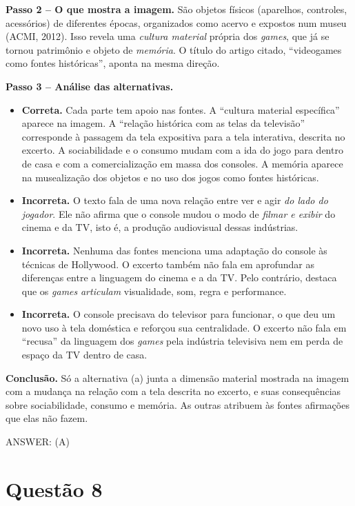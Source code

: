 \documentclass{article}%
\begin{document}
\textbf{Passo 2 -- O que mostra a imagem.} São objetos físicos (aparelhos, controles, acessórios) de diferentes épocas, organizados como acervo e expostos num museu (ACMI, 2012). Isso revela uma \emph{cultura material} própria dos \emph{games}, que já se tornou patrimônio e objeto de \emph{memória}. O título do artigo citado, ``videogames como fontes históricas'', aponta na mesma direção.

\textbf{Passo 3 -- Análise das alternativas.}
\begin{itemize}
\item[a)] \textbf{Correta.} Cada parte tem apoio nas fontes. A ``cultura material específica'' aparece na imagem. A ``relação histórica com as telas da televisão'' corresponde à passagem da tela expositiva para a tela interativa, descrita no excerto. A sociabilidade e o consumo mudam com a ida do jogo para dentro de casa e com a comercialização em massa dos consoles. A memória aparece na musealização dos objetos e no uso dos jogos como fontes históricas.
\item[b)] \textbf{Incorreta.} O texto fala de uma nova relação entre ver e agir \emph{do lado do jogador}. Ele não afirma que o console mudou o modo de \emph{filmar e exibir} do cinema e da TV, isto é, a produção audiovisual dessas indústrias.
\item[c)] \textbf{Incorreta.} Nenhuma das fontes menciona uma adaptação do console às técnicas de Hollywood. O excerto também não fala em aprofundar as diferenças entre a linguagem do cinema e a da TV. Pelo contrário, destaca que os \emph{games} \emph{articulam} visualidade, som, regra e performance.
\item[d)] \textbf{Incorreta.} O console precisava do televisor para funcionar, o que deu um novo uso à tela doméstica e reforçou sua centralidade. O excerto não fala em ``recusa'' da linguagem dos \emph{games} pela indústria televisiva nem em perda de espaço da TV dentro de casa.
\end{itemize}

\textbf{Conclusão.} Só a alternativa (a) junta a dimensão material mostrada na imagem com a mudança na relação com a tela descrita no excerto, e suas consequências sobre sociabilidade, consumo e memória. As outras atribuem às fontes afirmações que elas não fazem.

\medskip
ANSWER: (A)%
\newpage%
\section*{Questão 8}
\end{document}
